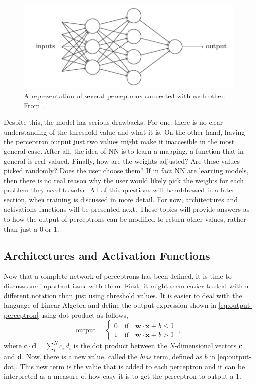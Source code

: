 \begin{figure}
    \centering
    \includegraphics[scale=0.4]{figuras/capitulo-3/multi-perceptron}
    \caption{A representation of several perceptrons connected with each other. From~\cite{nielsenNeuralNetworksDeep2015}.}
    \label{fig:multi-perceptron}
\end{figure}

Despite this, the model has serious drawbacks. For one, 
there is no clear understanding of the threshold value and what it is. On the other hand, 
having the perceptron output just two values might make it inaccesible in the most general 
case. After all, the idea of NN is to learn a mapping, a function that in general is 
real-valued. Finally, how are the weights adjusted? Are these values picked randomly? Does 
the user choose them? If in fact NN are learning models, then there is no real reason why 
the user would likely pick the weights for each problem they need to solve. All of this 
questions will be addressed in a later section, when training is discussed in more detail.
For now, architectures and activations functions will be presented next. These topics will
provide answers as to how the output of perceptrons can be modified to return other values,
rather than just a \(0\) or \(1\).

\subsection{Architectures and Activation Functions}
Now that a complete network of perceptrons has been defined, it is time to discuss one 
important issue with them. First, it might seem easier to deal with a different notation 
than just using threshold values. It is easier to deal with the language of Linear Algebra 
and define the output expression shown in \autoref{eq:output-perceptron} using dot product 
as follows,
\begin{equation}
    \text{output} = \begin{cases}
        0 \quad \text{if} \quad \mathbf{w} \cdot \mathbf{x} + b \leq 0 \\
        1 \quad \text{if} \quad \mathbf{w} \cdot \mathbf{x} + b > 0
    \end{cases}
    \; ,
    \label{eq:output-dot}
\end{equation}
where \(\mathbf{c} \cdot \mathbf{d} = \sum_{i}^{N} c_i \, d_i\) is the dot product between 
the $N$-dimensional vectors \(\mathbf{c}\) and \(\mathbf{d}\). Now, there is a new value, 
called the \emph{bias} term, defined as \(b\) in \autoref{eq:output-dot}. This new term is 
the value that is added to each perceptron and it can be interpreted as a measure of how 
easy it is to get the perceptron to output a \(1\).

